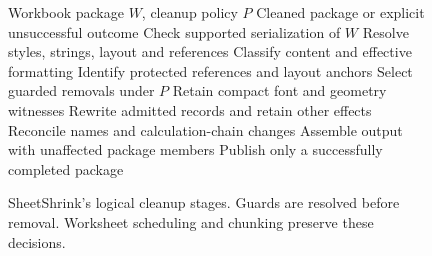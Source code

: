\begin{figure}[t]
\footnotesize
\begin{algorithmic}[1]
\Require Workbook package $W$, cleanup policy $P$
\Ensure Cleaned package or explicit unsuccessful outcome
\State Check supported serialization of $W$
\State Resolve styles, strings, layout and references
  \State Classify content and effective formatting
  \State Identify protected references and layout anchors
  \State Select guarded removals under $P$
  \State Retain compact font and geometry witnesses
  \State Rewrite admitted records and retain other effects
\EndFor
\State Reconcile names and calculation-chain changes
\State Assemble output with unaffected package members
\State Publish only a successfully completed package
\end{algorithmic}
\caption{SheetShrink's logical cleanup stages. Guards are resolved before
removal. Worksheet scheduling and chunking preserve these decisions.}
\label{fig:cleanup-algorithm}
\end{figure}
